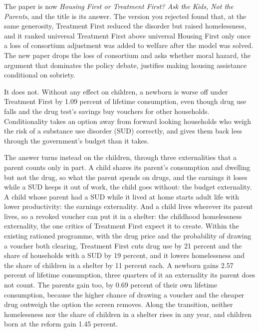 \documentclass[11pt]{article}
\begin{document}
{\color{respred}
The paper is now \emph{Housing First or Treatment First? Ask the Kids, Not the
Parents}, and the title is its answer. The version you rejected found that, at the same
generosity, Treatment First reduced the disorder but raised homelessness, and it ranked
universal Treatment First above universal Housing First only once a loss of consortium
adjustment was added to welfare after the model was solved. The new paper drops the loss
of consortium and asks whether moral hazard, the argument that dominates the policy
debate, justifies making housing assistance conditional on sobriety.

It does not. Without any effect on children, a newborn is worse off under Treatment First
by 1.09 percent of lifetime consumption, even though drug use falls and the drug test's
savings buy vouchers for other households. Conditionality takes an option away from
forward looking households who weigh the risk of a substance use disorder (SUD)
correctly, and gives them back less through the government's budget than it takes.

The answer turns instead on the children, through three externalities that a parent
counts only in part. A child shares its parent's consumption and dwelling but not the
drug, so what the parent spends on drugs, and the earnings it loses while a SUD keeps it
out of work, the child goes without: the budget externality. A child whose parent had a
SUD while it lived at home starts adult life with lower productivity: the earnings
externality. And a child lives wherever its parent lives, so a revoked voucher can put it
in a shelter: the childhood homelessness externality, the one critics of Treatment First
expect it to create. Within the existing rationed programme, with the drug price and the
probability of drawing a voucher both clearing, Treatment First cuts drug use by 21
percent and the share of households with a SUD by 19 percent, and it lowers homelessness
and the share of children in a shelter by 11 percent each. A newborn gains 2.57 percent of
lifetime consumption, three quarters of it an externality its parent does not count. The
parents gain too, by 0.69 percent of their own lifetime consumption, because the higher
chance of drawing a voucher and the cheaper drug outweigh the option the screen removes.
Along the transition, neither homelessness nor the share of children in a shelter rises
in any year, and children born at the reform gain 1.45 percent.

}
\end{document}
